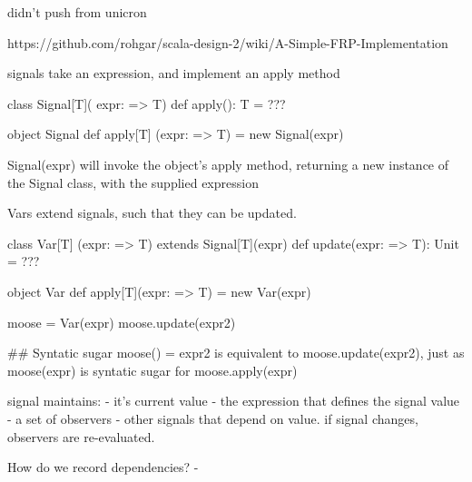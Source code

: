 didn't push from unicron

https://github.com/rohgar/scala-design-2/wiki/A-Simple-FRP-Implementation

signals take an expression, and implement an apply method

class Signal[T]( expr: => T) {
    def apply(): T = ??? 
}

object Signal {
    def apply[T] (expr: => T) = new Signal(expr)
}

Signal(expr) will invoke the object's apply method, returning a new instance of the Signal class, with the supplied expression

Vars extend signals, such that they can be updated.

class Var[T] (expr: => T) extends Signal[T](expr) {
    def update(expr: => T): Unit = ???
}

object Var { 
    def apply[T](expr: => T) = new Var(expr)
}

moose = Var(expr)
moose.update(expr2)

## Syntatic sugar
moose() = expr2 is equivalent to moose.update(expr2), just as moose(expr) is syntatic sugar for moose.apply(expr)


signal maintains:
  - it's current value
  - the expression that defines the signal value
  - a set of observers - other signals that depend on value.
if signal changes, observers are re-evaluated.

How do we record dependencies?
  - 